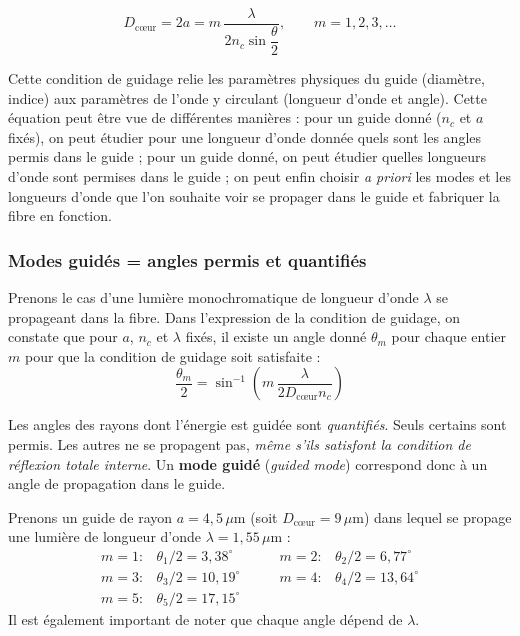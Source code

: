\begin{theorem}
  \begin{equation*}
    D_{\text{cœur}} = 2a = m\,\frac{\lambda}{2n_c\sin\dfrac{\theta}{2}},
    \qquad m = 1,2,3,\dots
  \end{equation*}
\end{theorem}

Cette condition de guidage relie les paramètres physiques du guide (diamètre,
indice) aux paramètres de l'onde y circulant (longueur d'onde et angle). Cette
équation peut être vue de différentes manières : pour un guide donné ($n_c$ et
$a$ fixés), on peut étudier pour une longueur d'onde donnée quels sont les
angles permis dans le guide ; pour un guide donné, on peut étudier quelles
longueurs d'onde sont permises dans le guide ; on peut enfin choisir
\emph{a priori} les modes et les longueurs d'onde que l'on souhaite voir se
propager dans le guide et fabriquer la fibre en fonction.

\subsubsection{Modes guidés = angles permis et quantifiés}
Prenons le cas d'une lumière monochromatique de longueur d'onde $\lambda$ se
propageant dans la fibre. Dans l'expression de la condition de guidage, on
constate que pour $a$, $n_c$ et $\lambda$ fixés, il existe un angle donné
$\theta_m$ pour chaque entier $m$ pour que la condition de guidage soit
satisfaite :
\begin{equation*}
  \boxed{\;\frac{\theta_m}{2}
    = \sin^{-1}\!\left(m\,\frac{\lambda}{2 D_{\text{cœur}} n_c}\right)\;}
\end{equation*}

\begin{conclusion}
  Les angles des rayons dont l'énergie est guidée sont \emph{quantifiés}.
  Seuls certains sont permis. Les autres ne se propagent pas, \emph{même s'ils
  satisfont la condition de réflexion totale interne}. Un \textbf{mode guidé}
  (\textit{guided mode}) correspond donc à un angle de propagation dans le
  guide.
\end{conclusion}

\begin{example}
  Prenons un guide de rayon $a = 4{,}5\,\mu$m (soit $D_{\text{cœur}} =
  9\,\mu$m) dans lequel se propage une lumière de longueur d'onde
  $\lambda = 1{,}55\,\mu$m :
  \[
    \begin{array}{llll}
      m = 1: & \theta_1/2 = 3{,}38^\circ \qquad&
      m = 2: & \theta_2/2 = 6{,}77^\circ \\
      m = 3: & \theta_3/2 = 10{,}19^\circ \qquad&
      m = 4: & \theta_4/2 = 13{,}64^\circ \\
      m = 5: & \theta_5/2 = 17{,}15^\circ &&
    \end{array}
  \]
  Il est également important de noter que chaque angle dépend de $\lambda$.
\end{example}

